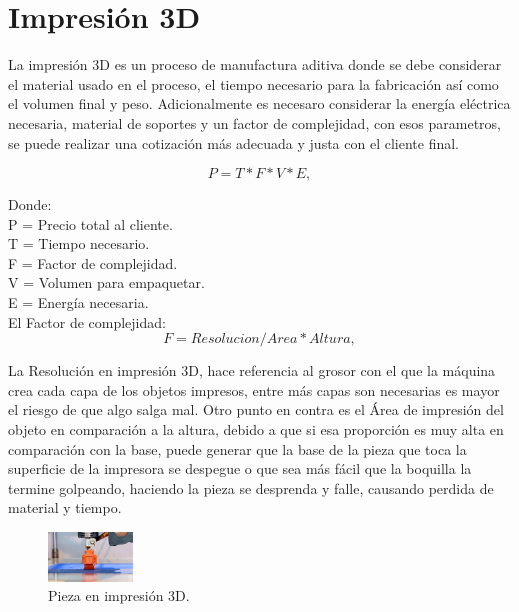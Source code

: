 \documentclass[conference]{IEEEtran}
\begin{document}
\section{Impresión 3D}

La impresión 3D es un proceso de manufactura aditiva donde se debe considerar el material usado en el proceso, el tiempo necesario para la fabricación así como el volumen final y peso. Adicionalmente es necesaro considerar la energía eléctrica necesaria, material de soportes y un factor de complejidad, con esos parametros, se puede realizar una cotización más adecuada y justa con el cliente final.

\begin{equation}
\label{ohm}
P=T*F*V*E,
\end{equation}

Donde:\\

P = Precio total al cliente.\\
T = Tiempo necesario.\\
F = Factor de complejidad.\\
V = Volumen para empaquetar.\\
E = Energía necesaria.\\

El Factor de complejidad:  
 \begin{equation}
    \label{Homotopia_G}
     F= Resolucion / Area * Altura,
 \end{equation}
 
          
     
La Resolución en impresión 3D, hace referencia al grosor con el que la máquina crea cada capa de los objetos impresos, entre más capas son necesarias es mayor el riesgo de que algo salga mal. Otro punto en contra es el Área de impresión del objeto en comparación a la altura, debido a que si esa proporción es muy alta en comparación con la base, puede generar que la base de la pieza que toca la superficie de la impresora se despegue o que sea más fácil que la boquilla la termine golpeando, haciendo la pieza se desprenda y falle, causando perdida de material y tiempo. 

\begin{figure}[H]
\begin{center}
\includegraphics[width=0.2\textwidth]{imagenes/imp3d.eps} 
\caption{ Pieza en impresión 3D.}
\label{fig:hiper2}
\end{center}
\end{figure}   
 
\end{document}
